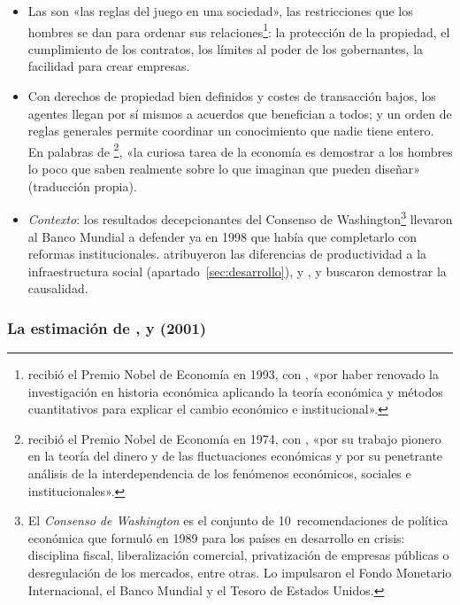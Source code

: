 \documentclass[11pt]{article}
\begin{document}
\begin{itemize}
\item Las  son «las reglas del juego en una sociedad», las restricciones que los hombres se dan para ordenar sus relaciones\nocite{North1990}\footnote{ recibió el Premio Nobel de Economía en 1993, con , «por haber renovado la investigación en historia económica aplicando la teoría económica y métodos cuantitativos para explicar el cambio económico e institucional»\nocite{NobelPrize1993North}.}: la protección de la propiedad, el cumplimiento de los contratos, los límites al poder de los gobernantes, la facilidad para crear empresas.
\item Con derechos de propiedad bien definidos y costes de transacción bajos, los agentes llegan por sí mismos a acuerdos que benefician a todos\nocite{Coase1960}; y un orden de reglas generales permite coordinar un conocimiento que nadie tiene entero. En palabras de \textcite[p.~76]{Hayek1988}\footnote{ recibió el Premio Nobel de Economía en 1974, con , «por su trabajo pionero en la teoría del dinero y de las fluctuaciones económicas y por su penetrante análisis de la interdependencia de los fenómenos económicos, sociales e institucionales»\nocite{NobelPrize1974}.}, «la curiosa tarea de la economía es demostrar a los hombres lo poco que saben realmente sobre lo que imaginan que pueden diseñar» (traducción propia).
\item \emph{Contexto}: los resultados decepcionantes del Consenso de Washington\footnote{El \emph{Consenso de Washington} es el conjunto de 10~recomendaciones de política económica que  formuló en 1989 para los países en desarrollo en crisis: disciplina fiscal, liberalización comercial, privatización de empresas públicas o desregulación de los mercados, entre otras\nocite{Williamson1990}. Lo impulsaron el Fondo Monetario Internacional, el Banco Mundial y el Tesoro de Estados Unidos.} llevaron al Banco Mundial a defender ya en 1998 que había que completarlo con reformas institucionales\nocite{BurkiPerry1998}. \textcite{HallJones1999Why} atribuyeron las diferencias de productividad a la infraestructura social (apartado~\ref{sec:desarrollo}), y ,  y  buscaron demostrar la causalidad.
\end{itemize}

\subsubsection{La estimación de ,  y  (2001)}\label{sec:ajr}
\end{document}
